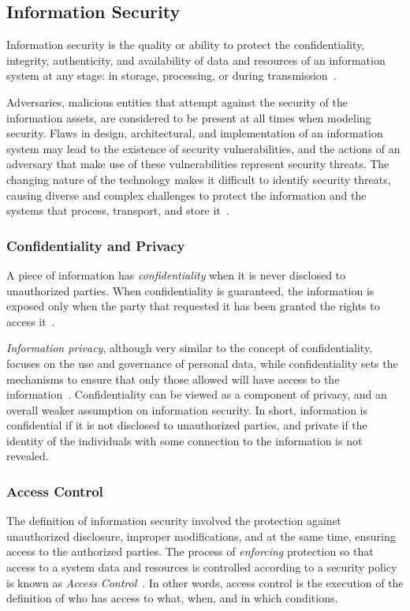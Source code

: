 \documentclass[12pt]{article}
\begin{document}
\subsection{Information Security}

Information security is the quality or ability to protect the confidentiality, integrity, authenticity, and availability of data and resources of an information system at any stage: in storage, processing, or during transmission~\cite{whitman2011principles}.

Adversaries, malicious entities that attempt against the security of the information assets, are considered to be present at all times when modeling security. Flaws in design, architectural, and implementation of an information system may lead to the existence of security vulnerabilities, and the actions of an adversary that make use of these vulnerabilities represent security threats. The changing nature of the technology makes it difficult to identify security threats, causing diverse and complex challenges to protect the information and the systems that process, transport, and store it~\cite{whitman2003}.

\subsubsection{Confidentiality and Privacy}

A piece of information has \emph{confidentiality} when it is never disclosed to unauthorized parties. When confidentiality is guaranteed, the information is exposed only when the party that requested it has been granted the rights to access it~\cite{whitman2011principles}.

\emph{Information privacy}, although very similar to the concept of confidentiality, focuses on the use and governance of personal data, while confidentiality sets the mechanisms to ensure that only those allowed will have access to the information~\cite{heckman}. Confidentiality can be viewed as a component of privacy, and an overall weaker assumption on information security. In short, information is confidential if it is not disclosed to unauthorized parties, and private if the identity of the individuals with some connection to the information is not revealed.

\subsubsection{Access Control}

The definition of information security involved the protection against unauthorized disclosure, improper modifications, and at the same time, ensuring access to the authorized parties. The process of \emph{enforcing} protection so that access to a system data and resources is controlled according to a security policy is known as \emph{Access Control}~\cite{access_02}. In other words, access control is the execution of the definition of who has access to what, when, and in which conditions.
\end{document}
